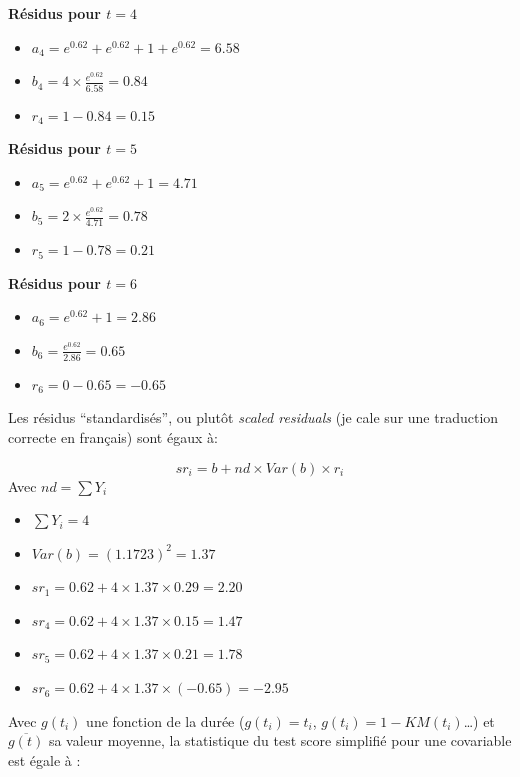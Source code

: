 \documentclass[
  12pt,
  letterpaper,
  DIV=11,
  numbers=noendperiod,
  onepage,
  openany]{scrreprt}
\providecommand{\tightlist}{%
  \setlength{\itemsep}{0pt}\setlength{\parskip}{0pt}}\usepackage{longtable,booktabs,array}
\begin{document}
\textbf{Résidus pour \(t=4\)}

\begin{itemize}
\tightlist
\item
  \(a_4 = e^{0.62} + e^{0.62} + 1 + e^{0.62} = 6.58\)
\item
  \(b_4 = 4\times\frac{e^{0.62}}{6.58} = 0.84\)
\item
  \(r_4 = 1 - 0.84 = 0.15\)
\end{itemize}

\textbf{Résidus pour \(t=5\)}

\begin{itemize}
\tightlist
\item
  \(a_5 = e^{0.62} + e^{0.62} + 1 = 4.71\)
\item
  \(b_5 = 2\times\frac{e^{0.62}}{4.71} = 0.78\)
\item
  \(r_5 = 1 - 0.78 = 0.21\)
\end{itemize}

\textbf{Résidus pour \(t=6\)}

\begin{itemize}
\tightlist
\item
  \(a_6 = e^{0.62} + 1 = 2.86\)
\item
  \(b_6 = \frac{e^{0.62}}{2.86} = 0.65\)
\item
  \(r_6 = 0 - 0.65 = -0.65\)
\end{itemize}

Les résidus ``standardisés'', ou plutôt \emph{scaled residuals} (je cale
sur une traduction correcte en français) sont égaux à:

\[sr_i = b + nd \times Var(b) \times r_i\] Avec \(nd= \sum Y_i\)

\begin{itemize}
\item
  \(\sum Y_i = 4\)
\item
  \(Var(b) = (1.1723)^2=1.37\)
\item
  \(sr_1 = 0.62 + 4\times 1.37 \times 0.29 = 2.20\)
\item
  \(sr_4 = 0.62 + 4\times 1.37 \times 0.15 = 1.47\)
\item
  \(sr_5 = 0.62 + 4\times 1.37 \times 0.21 = 1.78\)
\item
  \(sr_6 = 0.62 + 4\times 1.37 \times (-0.65) = -2.95\)
\end{itemize}

Avec \(g(t_i)\) une fonction de la durée (\(g(t_i)=t_i\),
\(g(t_i)=1-KM(t_i)\)\ldots) et \(\overline{g(t)}\) sa valeur moyenne, la
statistique du test score simplifié pour une covariable est égale à :
\end{document}
